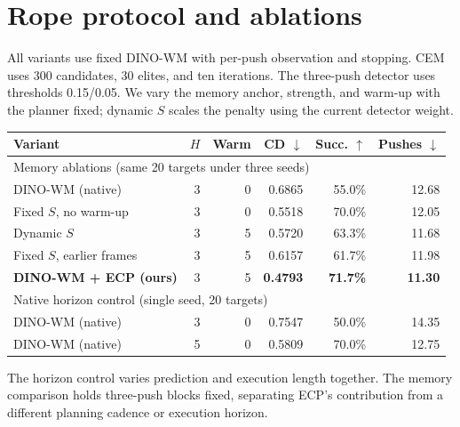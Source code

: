 \begin{table}[!t]
\begin{minipage}[t]{\columnwidth}
\section{Rope protocol and ablations}
\label{sec:rope-details}
All variants use fixed DINO-WM with per-push observation and stopping. CEM uses 300 candidates, 30 elites, and ten iterations. The three-push detector uses thresholds 0.15/0.05. We vary the memory anchor, strength, and warm-up with the planner fixed; dynamic $S$ scales the penalty using the current detector weight.\par\smallskip
{\centering
{}
\label{tab:rope-ablation}
\small\setlength{\tabcolsep}{2pt}
\begin{tabular}{lrrrrr}
\toprule
Variant & $H$ & Warm & CD $\downarrow$ & Succ. $\uparrow$ & Pushes $\downarrow$\\
\midrule
\multicolumn{6}{l}{Memory ablations (same 20 targets under three seeds)}\\
DINO-WM (native) &3&0&0.6865&55.0\%&12.68\\
Fixed $S$, no warm-up&3&0&0.5518&70.0\%&12.05\\
Dynamic $S$&3&5&0.5720&63.3\%&11.68\\
Fixed $S$, earlier frames&3&5&0.6157&61.7\%&11.98\\
\textbf{DINO-WM + ECP (ours)}&3&5&\textbf{0.4793}&\textbf{71.7\%}&\textbf{11.30}\\
\midrule
\multicolumn{6}{l}{Native horizon control (single seed, 20 targets)}\\
DINO-WM (native)&3&0&0.7547&50.0\%&14.35\\
DINO-WM (native)&5&0&0.5809&70.0\%&12.75\\
\bottomrule
\end{tabular}
\par}
\par\smallskip
The horizon control varies prediction and execution length together. The memory comparison holds three-push blocks fixed, separating ECP's contribution from a different planning cadence or execution horizon.
\end{minipage}\hfill
\begin{minipage}[t]{\columnwidth}
\vspace{0pt}

\end{minipage}
\end{table}
